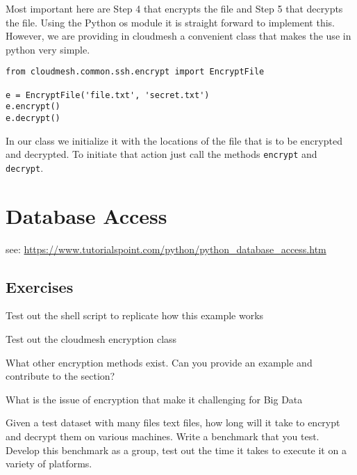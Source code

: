 Most important here are Step 4 that encrypts the file and Step 5 that
decrypts the file. Using the Python os module it is straight forward
to implement this. However, we are providing in cloudmesh a convenient
class that makes the use in python very simple.

\begin{verbatim}
from cloudmesh.common.ssh.encrypt import EncryptFile

e = EncryptFile('file.txt', 'secret.txt')
e.encrypt()
e.decrypt()
\end{verbatim}

In our class we initialize it with the locations of the file that is
to be encrypted and decrypted. To initiate that action just call the
methods \verb|encrypt| and \verb|decrypt|.

\section{Database Access}\label{database-access}


see: \url{https://www.tutorialspoint.com/python/python_database_access.htm}


\subsection{Exercises}

\begin{exercise}
\label{E:Encryption.1} Test out the shell script to replicate how this
  example works
\end{exercise}

\begin{exercise}
  \label{E:Encryption.2} Test out the cloudmesh encryption class
\end{exercise}

\begin{exercise}
  \label{E:Encryption.3} What other encryption methods exist. Can you
  provide an example and contribute to the section?
\end{exercise}

\begin{exercise}
  \label{E:Encryption.4} What is the issue of encryption that make it
  challenging for Big Data
\end{exercise}

\begin{exercise}
  \label{E:Encryption.5} Given a test dataset with many files text
  files, how long will it take to encrypt and decrypt them on various
  machines. Write a benchmark that you test. Develop this benchmark as
  a group, test out the time it takes to execute it on a variety of
  platforms.
\end{exercise}
